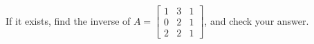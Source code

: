 If it exists, find the inverse of 
$A = \begin{bmatrix}  1 & 3 & 1 \\ 0 & 2 & 1 \\ 2 & 2 & 1\end{bmatrix}$, 
and check your answer.